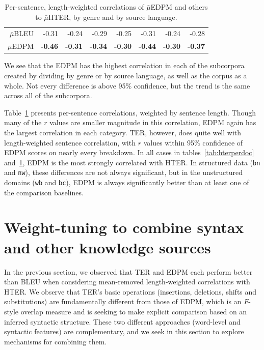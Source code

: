 \documentclass{kluwer}    %
\begin{document}
\begin{article}
\begin{subtable}
\begin{table}
\begin{tabular}{r|rrrr|rr|r}
      $\bar{\mu}$BLEU
      & -0.31 & -0.24  & -0.29 &  -0.25
      & -0.31  &  -0.24  & -0.28 \\
      $\bar{\mu}$EDPM
      & \textbf{-0.46} & \textbf{-0.31} & \textbf{-0.34} &
      \textbf{-0.30}
      & \textbf{-0.44} & \textbf{-0.30} & \textbf{-0.37} \\
      \hline
    \end{tabular}
    \caption{Per-sentence, length-weighted correlations of
      $\bar{\mu}$EDPM and others to $\bar{\mu}$HTER, by genre and by
      source language.}
    \label{tab:hterpersent}
  \end{table}
\end{subtable}
We see that the EDPM has the highest correlation in each of the
subcorpora created by dividing by genre or by source language, as well
as the corpus as a whole.  Not every difference is above 95\%
confidence, but the trend is the same across all of the
subcorpora. 

Table~\ref{tab:hterpersent} presents per-sentence correlations,
weighted by sentence length.  Though many of the $r$ values are
smaller magnitude in this correlation, EDPM again has the largest
correlation in each category.  TER, however, does quite well with
length-weighted sentence correlation, with $r$ values within 95\%
confidence of EDPM scores on nearly every breakdown.
%
In all cases in tables~\ref{tab:hterperdoc} and~\ref{tab:hterpersent},
EDPM is the most strongly correlated with HTER. In structured data
(\texttt{bn} and \texttt{nw}), these differences are not always
significant, but in the unstructured domains (\texttt{wb} and
\texttt{bc}), EDPM is always significantly better than at least one of
the comparison baselines.

\section{Weight-tuning to combine syntax and other knowledge sources}
\label{sec:hter2}

In the previous section, we observed that TER and EDPM each perform
better than BLEU when considering mean-removed length-weighted
correlations with HTER.  We observe that TER's basic operations
(insertions, deletions, shifts and substitutions) are fundamentally
different from those of EDPM, which is an $F$-style overlap measure
and is seeking to make explicit comparison based on an inferred
syntactic structure.  These two different approaches (word-level and
syntactic features) are complementary, and we seek in this section to
explore mechanisms for combining them.


\end{article}
\end{document}
